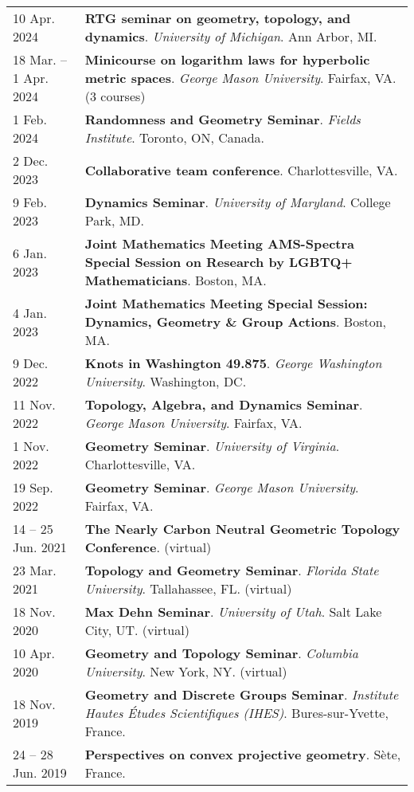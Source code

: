 \begin{center}
{\begin{longtable}{p{}  p{}}
10 Apr.  2024 & \textbf{RTG seminar on geometry, topology, and dynamics}. \textit{University of Michigan}.  Ann Arbor, MI.  \\ 
18 Mar.  -- 1 Apr.  2024 & \textbf{Minicourse on logarithm laws for hyperbolic metric spaces}. \textit{George Mason University}.  Fairfax, VA. (3 courses) \\ 
1 Feb.  2024 & \textbf{Randomness and Geometry Seminar}. \textit{Fields Institute}.  Toronto, ON, Canada.  \\ 
2 Dec.  2023 & \textbf{Collaborative team conference}.  Charlottesville, VA.  \\ 
9 Feb.  2023 & \textbf{Dynamics Seminar}. \textit{University of Maryland}.  College Park, MD.  \\ 
6 Jan.  2023 & \textbf{Joint Mathematics Meeting AMS-Spectra Special Session on Research by LGBTQ+ Mathematicians}.  Boston, MA.  \\ 
4 Jan.  2023 & \textbf{Joint Mathematics Meeting Special Session: Dynamics, Geometry \& Group Actions}.  Boston, MA.  \\ 
9 Dec.  2022 & \textbf{Knots in Washington 49.875}. \textit{George Washington University}.  Washington, DC.  \\ 
11 Nov.  2022 & \textbf{Topology, Algebra, and Dynamics Seminar}. \textit{George Mason University}.  Fairfax, VA.  \\ 
1 Nov.  2022 & \textbf{Geometry Seminar}. \textit{University of Virginia}.  Charlottesville, VA.  \\ 
19 Sep.  2022 & \textbf{Geometry Seminar}. \textit{George Mason University}.  Fairfax, VA.  \\ 
14  -- 25 Jun.  2021 & \textbf{The Nearly Carbon Neutral Geometric Topology Conference}. (virtual) \\ 
23 Mar.  2021 & \textbf{Topology and Geometry Seminar}. \textit{Florida State University}.  Tallahassee, FL. (virtual) \\ 
18 Nov.  2020 & \textbf{Max Dehn Seminar}. \textit{University of Utah}.  Salt Lake City, UT. (virtual) \\ 
10 Apr.  2020 & \textbf{Geometry and Topology Seminar}. \textit{Columbia University}.  New York, NY. (virtual) \\ 
18 Nov.  2019 & \textbf{Geometry and Discrete Groups Seminar}. \textit{Institute Hautes \'Etudes Scientifiques (IHES)}.  Bures-sur-Yvette, France.  \\ 
24  -- 28 Jun.  2019 & \textbf{Perspectives on convex projective geometry}.  S\`ete, France.  \\ 

\end{longtable}}
\end{center}

